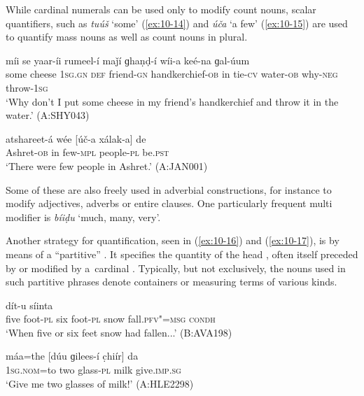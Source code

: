 While cardinal numerals can be used only to modify count nouns, scalar quantifiers, such as \textit{tuúš} `some' (\ref{ex:10-14}) and \textit{úča} `a few' (\ref{ex:10-15}) are used to quantify mass nouns as well as count nouns in plural. 

\begin{exe}
\ex
\label{ex:10-14}
 míi se yaar-íi rumeel-í maǰí ɡhaṇḍ-í wíi-a keé-na ɡal-úum \\
some cheese \textsc{1sg.gn} \textsc{def} friend-\textsc{gn} handkerchief-\textsc{ob}  in tie-\textsc{cv} water-\textsc{ob} why-\textsc{neg} throw-\textsc{1sg} \\
\glt `Why don't I put some cheese in my friend's handkerchief and throw it in the water.' (A:SHY043)

\ex
\label{ex:10-15}
\gll atshareet-á wée [úč-a xálak-a] de \\
Ashret-\textsc{ob} in few-\textsc{mpl} people-\textsc{pl} be.\textsc{pst} \\
\glt `There were few people in Ashret.' (A:JAN001)
\end{exe}

Some of these are also freely used in adverbial constructions, for instance to modify adjectives, adverbs or entire clauses. One particularly frequent multi modifier is \textit{bíiḍu} `much, many, very'.


Another strategy for quantification, seen in (\ref{ex:10-16}) and (\ref{ex:10-17}), is by means of a ``partitive''  . It specifies the quantity of the head , often itself preceded by or modified by a~cardinal . Typically, but not exclusively, the nouns used in such partitive phrases denote containers or measuring terms of various kinds.

\begin{exe}
\ex
\label{ex:10-16}
 dít-u síinta \\
five foot-\textsc{pl} six foot-\textsc{pl} snow fall.\textsc{pfv"=msg} \textsc{condh} \\
\glt `When five or six feet snow had fallen...' (B:AVA198)

\ex
\label{ex:10-17}
\gll máa=the [dúu ɡilees-í c̣hiír] da \\
\textsc{1sg}.\textsc{nom}=to two glass-\textsc{pl} milk give.\textsc{imp.sg} \\
\glt `Give me two glasses of milk!' (A:HLE2298)
\end{exe}

